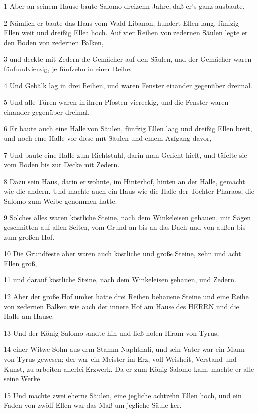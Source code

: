 \par 1 Aber an seinem Hause baute Salomo dreizehn Jahre, daß er's ganz ausbaute.
\par 2 Nämlich er baute das Haus vom Wald Libanon, hundert Ellen lang, fünfzig Ellen weit und dreißig Ellen hoch. Auf vier Reihen von zedernen Säulen legte er den Boden von zedernen Balken,
\par 3 und deckte mit Zedern die Gemächer auf den Säulen, und der Gemächer waren fünfundvierzig, je fünfzehn in einer Reihe.
\par 4 Und Gebälk lag in drei Reihen, und waren Fenster einander gegenüber dreimal.
\par 5 Und alle Türen waren in ihren Pfosten viereckig, und die Fenster waren einander gegenüber dreimal.
\par 6 Er baute auch eine Halle von Säulen, fünfzig Ellen lang und dreißig Ellen breit, und noch eine Halle vor diese mit Säulen und einem Aufgang davor,
\par 7 Und baute eine Halle zum Richtstuhl, darin man Gericht hielt, und täfelte sie vom Boden bis zur Decke mit Zedern.
\par 8 Dazu sein Haus, darin er wohnte, im Hinterhof, hinten an der Halle, gemacht wie die andern. Und machte auch ein Haus wie die Halle der Tochter Pharaos, die Salomo zum Weibe genommen hatte.
\par 9 Solches alles waren köstliche Steine, nach dem Winkeleisen gehauen, mit Sägen geschnitten auf allen Seiten, vom Grund an bis an das Dach und von außen bis zum großen Hof.
\par 10 Die Grundfeste aber waren auch köstliche und große Steine, zehn und acht Ellen groß,
\par 11 und darauf köstliche Steine, nach dem Winkeleisen gehauen, und Zedern.
\par 12 Aber der große Hof umher hatte drei Reihen behauene Steine und eine Reihe von zedernen Balken wie auch der innere Hof am Hause des HERRN und die Halle am Hause.
\par 13 Und der König Salomo sandte hin und ließ holen Hiram von Tyrus,
\par 14 einer Witwe Sohn aus dem Stamm Naphthali, und sein Vater war ein Mann von Tyrus gewesen; der war ein Meister im Erz, voll Weisheit, Verstand und Kunst, zu arbeiten allerlei Erzwerk. Da er zum König Salomo kam, machte er alle seine Werke.
\par 15 Und machte zwei eherne Säulen, eine jegliche achtzehn Ellen hoch, und ein Faden von zwölf Ellen war das Maß um jegliche Säule her.
